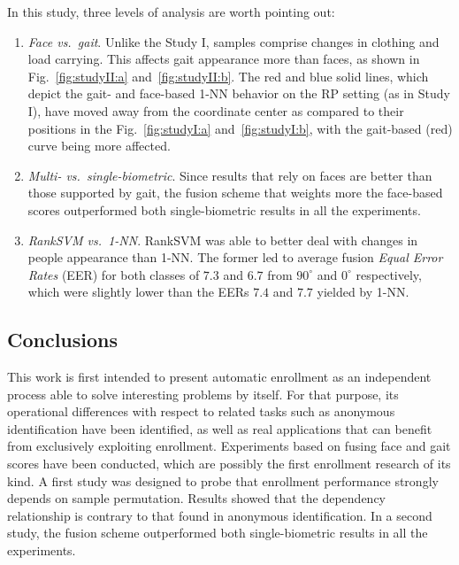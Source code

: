 \documentclass{llncs}
\begin{document}
In this study, three levels of analysis are worth pointing out: 
\begin{enumerate}
\item \emph{Face vs.~gait}. Unlike the Study I, samples comprise changes in clothing and load carrying. This affects gait appearance more than faces, as shown in Fig.~\ref{fig:studyII:a} and~\ref{fig:studyII:b}. The red and blue solid lines, which depict the gait- and face-based 1-NN behavior on the RP setting (as in Study I), have moved away from the coordinate center as compared to their positions in the Fig.~\ref{fig:studyI:a} and~\ref{fig:studyI:b}, with the gait-based (red) curve being more affected.  
\item \emph{Multi- vs.~single-biometric}. Since results that rely on faces are better than those supported by gait, the fusion scheme that weights more the face-based scores outperformed both single-biometric results in all the experiments.
\item \emph{RankSVM vs.~1-NN}. RankSVM was able to better deal with changes in people appearance than 1-NN. The former led to average fusion \emph{Equal Error Rates} (EER) for both classes of $7.3$ and $6.7$ from $90^{\circ}$ and $0^{\circ}$ respectively, which were slightly lower than the EERs $7.4$ and $7.7$ yielded by 1-NN. 
\end{enumerate}

\subsection{Conclusions}\label{sec:conclusions}

This work is first intended to present automatic enrollment as an independent process able to solve interesting problems by itself. For that purpose, its operational differences with respect to related tasks such as anonymous identification have been identified, as well as real applications that can benefit from exclusively exploiting enrollment. Experiments based on fusing face and gait scores have been conducted, which are possibly the first enrollment research of its kind. A first study was designed to probe that enrollment performance strongly depends on sample permutation. Results showed that the dependency relationship is contrary to that found in anonymous identification. In a second study, the fusion scheme outperformed both single-biometric results in all the experiments.



\end{document}
